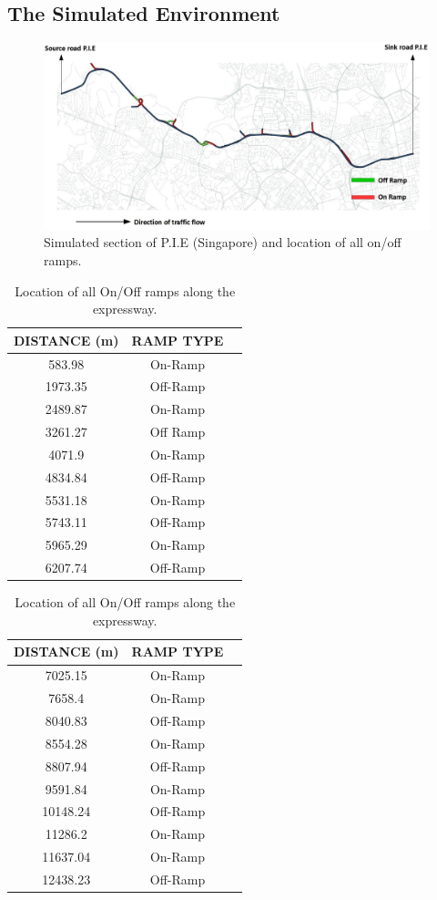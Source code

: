 \documentclass{wscpaperproc}
\theoremstyle{wsc}
\begin{document}
\subsection{The Simulated Environment}
\label{subsec:pie}

\begin{figure}[!htbp]
    \centering
    \includegraphics[scale=0.40]{images/PIE.jpg}

    \caption{Simulated section of P.I.E (Singapore) and location of all on/off ramps.}
    \label{fig:pie-changi}
  \end{figure}

\begin{table}[htb]
 \centering
 \caption{Location of all On/Off ramps along the expressway.}
\begin{tabular}[b]{ccc}\hline
      {\bf DISTANCE} (m) & {\bf RAMP TYPE} \\ \hline
     583.98 & On-Ramp \\ 
     1973.35 & Off-Ramp \\ 
     2489.87 & On-Ramp \\ 
     3261.27 & Off Ramp \\ 
     4071.9 & On-Ramp \\ 
     4834.84 & Off-Ramp \\ 
     5531.18 & On-Ramp \\ 
     5743.11 & Off-Ramp \\ 
     5965.29 & On-Ramp \\ 
     6207.74 & Off-Ramp \\ \hline
     \end{tabular}
     \quad
     \begin{tabular}[b]{ccc}\hline
       {\bf DISTANCE} (m) & {\bf RAMP TYPE} \\ \hline
     7025.15 & On-Ramp \\ 
     7658.4 & On-Ramp \\ 
     8040.83 & Off-Ramp \\ 
     8554.28 & On-Ramp \\ 
     8807.94 & Off-Ramp\\ 
     9591.84 & On-Ramp \\ 
     10148.24 & Off-Ramp \\ 
     11286.2 & On-Ramp \\ 
     11637.04 & On-Ramp \\ 
     12438.23 & Off-Ramp \\  \hline
    \end{tabular}
      \label{table:on-off-ramp}
\end{table}
\end{document}

